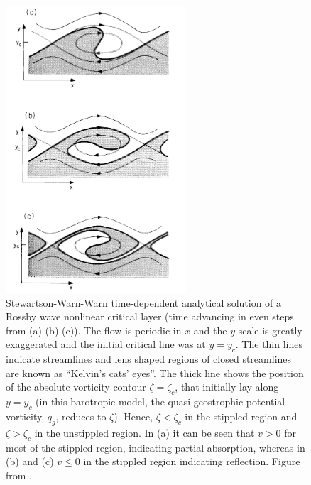 \begin{figure}
 \centering
 \noindent\includegraphics[width=0.6\textwidth]{figures/chapter-intro/breaking_wave_AHL.pdf}
 \caption[Results from a Stewartson-Warn-Warn model of wave
 breaking]{Stewartson-Warn-Warn time-dependent analytical solution of a Rossby
   wave nonlinear critical layer (time advancing in even steps from
   (a)-(b)-(c)). The flow is periodic in $x$ and the $y$ scale is greatly
   exaggerated and the initial critical line was at $y=y_c$. The thin lines
   indicate streamlines and lens shaped regions of closed streamlines are known
   as ``Kelvin's cats' eyes''. The thick line shows the position of the absolute
   vorticity contour $\zeta=\zeta_c$, that initially lay along $y=y_c$ (in this
   barotropic model, the quasi-geostrophic potential vorticity, $q_g$, reduces
   to $\zeta$). Hence, $\zeta<\zeta_c$ in the stippled region and
   $\zeta>\zeta_c$ in the unstippled region. In (a) it can be seen that $v>0$
   for most of the stippled region, indicating partial absorption, whereas in
   (b) and (c) $v\leq0$ in the stippled region indicating reflection. Figure
   from \citet{Andrews1987}.}
 \label{fig:cats_eyes}
\end{figure}

